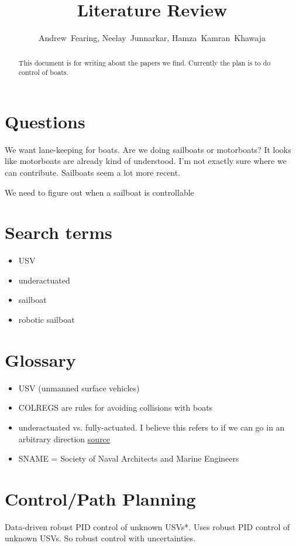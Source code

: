 \documentclass[conference]{IEEEtran}
\begin{document}
\title{Literature Review}
\author{Andrew~Fearing, Neelay~Junnarkar,  Hamza~Kamran~Khawaja}
\maketitle

\begin{abstract}
This document is for writing about the papers we find. Currently the plan is to do control of boats.
\end{abstract}

\section{Questions}
We want lane-keeping for boats. Are we doing sailboats or motorboats? It looks like motorboats are already kind of understood. I'm not exactly sure where we can contribute. Sailboats seem a lot more recent.

We need to figure out when a sailboat is controllable
\section{Search terms}
\begin{itemize}
    \item USV
    \item underactuated
    \item sailboat
    \item robotic sailboat
\end{itemize}
\section{Glossary}
\begin{itemize}
    \item USV (unmanned surface vehicles)
    \item COLREGS are rules for avoiding collisions with boats
    \item underactuated vs. fully-actuated. I believe this refers to if we can go in an arbitrary direction  \href{https://ocw.mit.edu/courses/electrical-engineering-and-computer-science/6-832-underactuated-robotics-spring-2009/readings/MIT6_832s09_read_ch01.pdf}{source}
    \item SNAME = Society of Naval Architects and Marine Engineers
\end{itemize}

\section{Control/Path Planning}
\cite{Nan2020} Data-driven robust PID control of unknown USVs*. Uses robust PID control of unknown USVs. So robust control with uncertainties.
\end{document}
